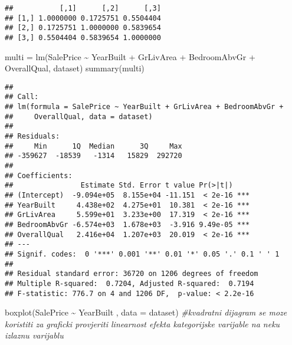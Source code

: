 \documentclass[
]{article}
\newenvironment{Shaded}{\begin{snugshade}}{\end{snugshade}}
\newcommand{\AttributeTok}[1]{\textcolor[rgb]{0.77,0.63,0.00}{#1}}
\newcommand{\CommentTok}[1]{\textcolor[rgb]{0.56,0.35,0.01}{\textit{#1}}}
\newcommand{\FunctionTok}[1]{\textcolor[rgb]{0.00,0.00,0.00}{#1}}
\newcommand{\NormalTok}[1]{#1}
\newcommand{\OtherTok}[1]{\textcolor[rgb]{0.56,0.35,0.01}{#1}}
\newcommand{\SpecialCharTok}[1]{\textcolor[rgb]{0.00,0.00,0.00}{#1}}
\begin{document}
\begin{Shaded}
\end{Shaded}

\begin{verbatim}
##           [,1]      [,2]      [,3]
## [1,] 1.0000000 0.1725751 0.5504404
## [2,] 0.1725751 1.0000000 0.5839654
## [3,] 0.5504404 0.5839654 1.0000000
\end{verbatim}

\begin{Shaded}
\begin{Highlighting}[]
\NormalTok{multi }\OtherTok{=} \FunctionTok{lm}\NormalTok{(SalePrice }\SpecialCharTok{\textasciitilde{}}\NormalTok{ YearBuilt }\SpecialCharTok{+}\NormalTok{  GrLivArea }\SpecialCharTok{+}\NormalTok{ BedroomAbvGr }\SpecialCharTok{+}\NormalTok{ OverallQual, dataset)}
\FunctionTok{summary}\NormalTok{(multi)}
\end{Highlighting}
\end{Shaded}

\begin{verbatim}
## 
## Call:
## lm(formula = SalePrice ~ YearBuilt + GrLivArea + BedroomAbvGr + 
##     OverallQual, data = dataset)
## 
## Residuals:
##     Min      1Q  Median      3Q     Max 
## -359627  -18539   -1314   15829  292720 
## 
## Coefficients:
##                Estimate Std. Error t value Pr(>|t|)    
## (Intercept)  -9.094e+05  8.155e+04 -11.151  < 2e-16 ***
## YearBuilt     4.438e+02  4.275e+01  10.381  < 2e-16 ***
## GrLivArea     5.599e+01  3.233e+00  17.319  < 2e-16 ***
## BedroomAbvGr -6.574e+03  1.678e+03  -3.916 9.49e-05 ***
## OverallQual   2.416e+04  1.207e+03  20.019  < 2e-16 ***
## ---
## Signif. codes:  0 '***' 0.001 '**' 0.01 '*' 0.05 '.' 0.1 ' ' 1
## 
## Residual standard error: 36720 on 1206 degrees of freedom
## Multiple R-squared:  0.7204, Adjusted R-squared:  0.7194 
## F-statistic: 776.7 on 4 and 1206 DF,  p-value: < 2.2e-16
\end{verbatim}

\begin{Shaded}
\begin{Highlighting}[]
\FunctionTok{boxplot}\NormalTok{(SalePrice }\SpecialCharTok{\textasciitilde{}}\NormalTok{ YearBuilt , }\AttributeTok{data =}\NormalTok{ dataset) }\CommentTok{\#kvadratni dijagram se moze koristiti za graficki provjeriti linearnost efekta kategorijske varijable na neku izlaznu varijablu}
\end{Highlighting}
\end{Shaded}
\end{document}

